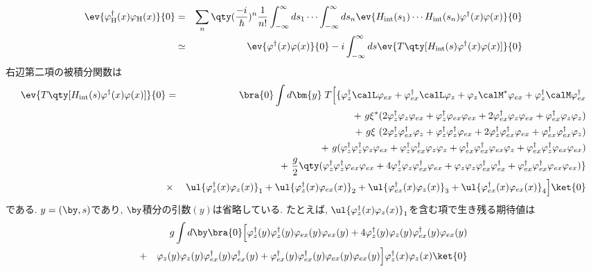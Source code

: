 \documentclass[10.5pt,a4paper]{jreport}
\begin{document}
\begin{eqnarray}
  \ev{\varphi_{\rm H}^\dagger(x)\varphi_{\rm H}(x)}{0} &=& \sum_n\qty(\frac{-i}{\hbar})^n\frac{1}{n!}\int_{-\infty}^\infty ds_1 \cdots\int_{-\infty}^\infty ds_n \ev{H_{\rm int}(s_1)\cdots H_{\rm int}(s_n)\varphi^\dagger(x)\varphi(x)}{0}\\
  &\simeq& \ev{\varphi^\dagger(x)\varphi(x)}{0} - i\int_{-\infty}^{\infty}ds\ev{T\qty[H_{\rm int}(s)\varphi^\dagger(x)\varphi(x)]}{0}
\end{eqnarray}
右辺第二項の被積分関数は
\begin{eqnarray}
  \nonumber \ev{T\qty[H_{\rm int}(s)\varphi^\dagger(x)\varphi(x)]}{0} &=& \bra{0}\int d\bm{y}\; T\Bigl[\{\varphi_z^\dagger\calL\varphi_{ex} + \varphi_{ex}^\dagger\calL\varphi_z + \varphi_z\calM^*\varphi_{ex} + \varphi_z^\dagger\calM\varphi_{ex}^\dagger\\
    \nonumber  && +\ g\xi^*(2\varphi_z^\dagger\varphi_z\varphi_{ex} + \varphi_z^\dagger\varphi_{ex}\varphi_{ex} + 2\varphi_{ex}^\dagger\varphi_z\varphi_{ex} + \varphi_{ex}^\dagger\varphi_z\varphi_z)\\
    \nonumber  && +\ g\xi\ (2\varphi_z^\dagger\varphi_{ex}^\dagger\varphi_z + \varphi_z^\dagger\varphi_z^\dagger\varphi_{ex} + 2\varphi_z^\dagger\varphi_{ex}^\dagger\varphi_{ex} + \varphi_{ex}^\dagger\varphi_{ex}^\dagger\varphi_z)\\
    \nonumber  && +\ g(\varphi^\dagger_z\varphi^\dagger_z\varphi_z\varphi_{ex} + \varphi^\dagger_z\varphi^\dagger_{ex}\varphi_z\varphi_z + \varphi_{ex}^\dagger\varphi^\dagger_{ex}\varphi_{ex}\varphi_{z} + \varphi^\dagger_{ex}\varphi^\dagger_{z}\varphi_{ex}\varphi_{ex}) \\
    \nonumber  && +\ \frac{g}{2}\qty(\varphi^\dagger_z \varphi^\dagger_z \varphi_{ex}\varphi_{ex} + 4\varphi^\dagger_z \varphi_z \varphi^\dagger_{ex}\varphi_{ex} + \varphi_z \varphi_z \varphi^\dagger_{ex}\varphi^\dagger_{ex} + \varphi_{ex}^\dagger\varphi_{ex}^\dagger\varphi_{ex}\varphi_{ex})\}\\
    \nonumber&\times& \ul{\varphi_{z}^\dagger(x)\varphi_{z}(x)}_1 + \ul{\varphi^\dagger_{z}(x)\varphi_{ex}(x)}_2 + \ul{\varphi^\dagger_{ex}(x)\varphi_{z}(x)}_3 + \ul{\varphi^\dagger_{ex}(x)\varphi_{ex}(x)}_4\Bigr]\ket{0}\\
\end{eqnarray}
である. $y = (\by, s)$であり, $\by$積分の引数$(y)$は省略している. たとえば, $\ul{\varphi_{z}^\dagger(x)\varphi_{z}(x)}_1$を含む項で生き残る期待値は
\begin{eqnarray}
  \nonumber  &&g\int d\by \bra{0} \Bigl[\varphi^\dagger_z(y) \varphi^\dagger_z(y) \varphi_{ex}(y)\varphi_{ex}(y) + 4\varphi^\dagger_z(y) \varphi_z(y) \varphi^\dagger_{ex}(y)\varphi_{ex}(y)\\
    \nonumber &+& \varphi_z(y) \varphi_z(y) \varphi^\dagger_{ex}(y)\varphi^\dagger_{ex}(y) + \varphi_{ex}^\dagger(y)\varphi_{ex}^\dagger(y)\varphi_{ex}(y)\varphi_{ex}(y)\Bigr]\varphi_{z}^\dagger(x)\varphi_{z}(x)\ket{0}
\end{eqnarray}
\end{document}
